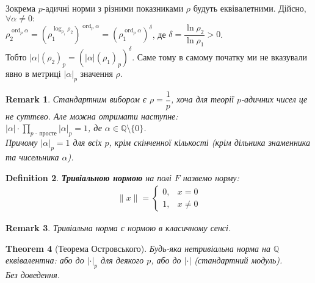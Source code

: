 \documentclass[a4paper, 14pt]{extarticle}
\theoremstyle{theoremdd}
\newtheorem{theorem}{Theorem}[subsection]
\theoremstyle{theoremdd}
\newtheorem{definition}[theorem]{Definition}
\theoremstyle{theoremdd}
\theoremstyle{theoremdd}
\theoremstyle{theoremdd}
\theoremstyle{theoremdd}
\newtheorem{remark}[theorem]{Remark}
\theoremstyle{theoremdd}
\theoremstyle{theoremdd}
\DeclareMathOperator{\ord}{ord}
\begin{document}
Зокрема $p$-адичні норми з різними показниками $\rho$ будуть еквівалетними. Дійсно, $\forall \alpha \neq 0:$\\
$\rho_2^{\ord_p \alpha} = \left( \rho_1^{\log_{\rho_1} \rho_2} \right)^{\ord_p \alpha} = \left(\rho_1^{\ord_p \alpha} \right)^{\delta}$, де $\delta = \dfrac{\ln \rho_2}{\ln \rho_1} > 0$.\\
Тобто $|\alpha|(\rho_2)_p = (|\alpha|(\rho_1)_p)^\delta$. Саме тому в самому початку ми не вказували явно в метриці $|\alpha|_p$ значення $\rho$.

\begin{remark}
Стандартним вибором є $\rho = \dfrac{1}{p}$, хоча для теорії $p$-адичних чисел це не суттєво. Але можна отримати наступне:\\
$|\alpha| \cdot \displaystyle\prod_{p \text{ - просте}} |\alpha|_p = 1$, де $\alpha \in \mathbb{Q} \setminus \{0\}$.\\
Причому $|\alpha|_p = 1$ для всіх $p$, крім скінченної кількості (крім дільника знаменника та чисельника $\alpha$).
\end{remark}

\begin{definition}
\textbf{Тривіальною нормою} на полі $F$ назвемо норму:
\begin{align*}
\lVert x \rVert = \begin{cases} 0, & x = 0 \\ 1, & x \neq 0 \end{cases}
\end{align*}
\end{definition}

\begin{remark}
Тривіальна норма є нормою в класичному сенсі.
\end{remark}

\begin{theorem}[Теорема Островського]
Будь-яка нетривіальна норма на $\mathbb{Q}$ еквівалентна: або до $|\cdot|_p$ для деякого $p$, або до $|\cdot|$ (стандартний модуль).\\
\textit{Без доведення.}
\end{theorem}
\fi
\end{document}
